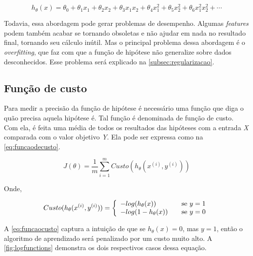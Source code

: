 \begin{equation}
\nonumber
h_{\theta}(x) = \theta_0 + \theta_1 x_1 + \theta_2 x_2 + \theta_3 x_1 x_2 + \theta_4 x_1^2 + \theta_5 x_2^2 + \theta_6 x_1^2 x_2^2 + \cdots
\end{equation}

Todavia, essa abordagem pode gerar problemas de desempenho. Algumas \textit{features} podem também acabar se tornando obsoletas e não ajudar em nada no resultado final, tornando seu cálculo inútil. Mas o principal problema dessa abordagem é o \textit{overfitting}, que faz com que a função de hipótese não generalize sobre dados desconhecidos. Esse problema será explicado na \autoref{subsec:regularizacao}.


\subsection{Função de custo}

Para medir a precisão da função de hipótese é necessário uma função que diga o quão precisa aquela hipótese é. Tal função é denominada de função de custo. Com ela, é feita uma média de todos os resultados das hipóteses com a entrada \textit{X} comparada com o valor objetivo \textit{Y}. Ela pode ser expressa como na \autoref{eq:funcaodecusto}.

\begin{equation}
\label{eq:funcaodecusto}
J(\theta) = \frac{1}{m}\sum\limits_{i=1}^{m}Custo(h_{\theta}(x^{(i)}, y^{(i)}))
\end{equation}

Onde,


\begin{align}
 Custo(h_{\theta}(x^{(i)}, y^{(i)})) = \left\{
  \begin{array}{l l} 
    -log(h_{\theta}(x)) & \quad \text{se } y=1 \\
    -log(1 - h_{\theta}(x)) & \quad \text{se } y=0 \label{eq:funcaocusto}
  \end{array} \right.
\end{align}


A \autoref{eq:funcaocusto} captura a intuição de que se $h_\theta(x) = 0$, mas $y = 1$, então o algoritmo de aprendizado será penalizado por um custo muito alto. A \autoref{fig:logfunctions} demonstra os dois respectivos casos dessa equação.


